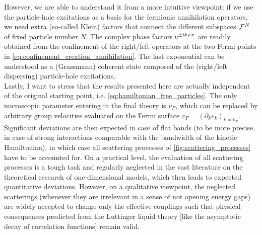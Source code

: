 However, we are able to understand it from a more intuitive viewpoint: if we use the particle-hole excitations as a basis for the fermionic annihilation operators, we need extra (so-called Klein) factors that connect the different subspaces $\mathcal{F}^N$ of fixed particle number $N$.
The complex phase factors $\mathrm e^{\pm\mathrm i k_Fx}$ are readily obtained from the confinement of the right/left operators at the two Fermi points in \cref{eq:confinement_creation_annihilation}.
The last exponential can be understood as a (Grassmann) coherent state composed of the (right/left dispersing) particle-hole excitations.
\\

Lastly, I want to stress that the results presented here are actually independent of the original starting point, i.e. \cref{eq:hamiltonian_free_particles}.
The only microscopic parameter entering in the final theory is $v_F$, which can be replaced by arbitrary group velocities evaluated on the Fermi surface $v_F=(\partial_k\varepsilon_k)_{k=k_F}$.
Significant deviations are then expected in case of flat bands (to be more precise, in case of strong interactions comparable with the bandwidth of the kinetic Hamiltonian), in which case all scattering processes of \cref{fig:scattering_processes} have to be accounted for.
On a practical level, the evaluation of all scattering processes is a tough task and regularly neglected in the vast literature on the theoretical research of one-dimensional models, which then leads to expected quantitative deviations.
However, on a qualitative viewpoint, the neglected scatterings (whenever they are irrelevant in a sense of not opening energy gaps) are widely accepted to change only the effective couplings such that physical consequences predicted from the Luttinger liquid theory [like the asymptotic decay of correlation functions] remain valid.
%
%
